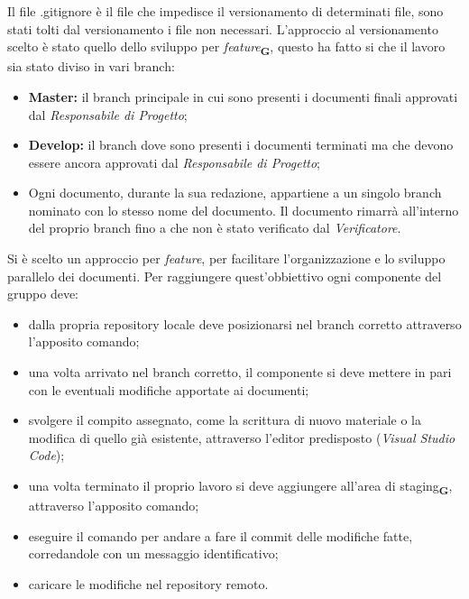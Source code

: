         Il file {\selectfont .gitignore} è il file che impedisce il versionamento di determinati file, sono stati tolti dal versionamento i file non necessari.
        L'approccio al versionamento scelto è stato quello dello sviluppo per \textit{feature}\textsubscript{\textbf{G}}, questo ha fatto si che il lavoro sia stato diviso in vari branch:
        \begin{itemize}
            \item \textbf{Master:} il branch principale in cui sono presenti i documenti finali approvati dal \textit{Responsabile di Progetto};
            \item \textbf{Develop:} il branch dove sono presenti i documenti terminati ma che devono essere ancora approvati dal \textit{Responsabile di Progetto};
            \item Ogni documento, durante la sua redazione, appartiene a un singolo branch nominato con lo stesso nome del documento. Il documento rimarrà all'interno del proprio branch fino a che non è stato verificato dal \textit{Verificatore}.
        \end{itemize}
        Si è scelto un approccio per \textit{feature}, per facilitare l'organizzazione e lo sviluppo parallelo dei documenti. Per raggiungere quest'obbiettivo ogni componente del gruppo deve:
        \begin{itemize}
            \item dalla propria repository locale deve posizionarsi nel branch corretto attraverso l'apposito comando;
            \item una volta arrivato nel branch corretto, il componente si deve mettere in pari con le eventuali modifiche apportate ai documenti;
            \item svolgere il compito assegnato, come la scrittura di nuovo materiale o la modifica di quello già esistente, attraverso l'editor predisposto (\textit{Visual Studio Code});
            \item una volta terminato il proprio lavoro si deve aggiungere all'area di staging\textsubscript{\textbf{G}}, attraverso l'apposito comando;
            \item eseguire il comando per andare a fare il commit delle modifiche fatte, corredandole con un messaggio identificativo;
            \item caricare le modifiche nel repository remoto. 
        \end{itemize}
